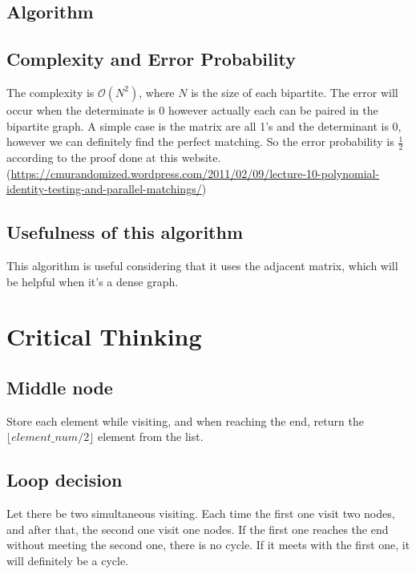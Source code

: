 \documentclass{article}
\begin{document}
\subsection{Algorithm}
\begin{algorithm}
\end{algorithm}
\subsection{Complexity and Error Probability}
The complexity is $\mathcal{O}(N^2)$, where $N$ is the size of each bipartite. The error will occur when the determinate is 0 however actually each can be paired in the bipartite graph. A simple case is the matrix are all 1's and the determinant is 0, however we can definitely find the perfect matching. So the error probability is $\frac{1}{2}$ according to the proof done at this website. (\url{https://cmurandomized.wordpress.com/2011/02/09/lecture-10-polynomial-identity-testing-and-parallel-matchings/})
\subsection{Usefulness of this algorithm}
This algorithm is useful considering that it uses the adjacent matrix, which will be helpful when it's a dense graph. 
\section{Critical Thinking}
\subsection{Middle node}
Store each element while visiting, and when reaching the end, return the $\lfloor element\_num/2 \rfloor$ element from the list.
\subsection{Loop decision}
Let there be two simultaneous visiting. Each time the first one visit two nodes, and after that, the second one visit one nodes. If the first one reaches the end without meeting the second one, there is no cycle. If it meets with the first one, it will definitely be a cycle.
\end{document}
